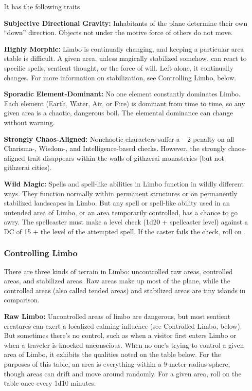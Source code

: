 It has the following traits.
\begin{itemize*}
\item \textbf{Subjective Directional Gravity:} Inhabitants of the plane determine their own ``down'' direction. Objects not under the motive force of others do not move.
\item \textbf{Highly Morphic:} Limbo is continually changing, and keeping a particular area stable is difficult. A given area, unless magically stabilized somehow, can react to specific spells, sentient thought, or the force of will. Left alone, it continually changes. For more information on stabilization, see Controlling Limbo, below.
\item \textbf{Sporadic Element-Dominant:} No one element constantly dominates Limbo. Each element (Earth, Water, Air, or Fire) is dominant from time to time, so any given area is a chaotic, dangerous boil. The elemental dominance can change without warning.
\item \textbf{Strongly Chaos-Aligned:} Nonchaotic characters suffer a $-2$ penalty on all Charisma-, Wisdom-, and Intelligence-based checks. However, the strongly chaos-aligned trait disappears within the walls of githzerai monasteries (but not githzerai cities).
\item \textbf{Wild Magic:} Spells and spell-like abilities in Limbo function in wildly different ways. They function normally within permanent structures or on permanently stabilized landscapes in Limbo. But any spell or spell-like ability used in an untended area of Limbo, or an area temporarily controlled, has a chance to go awry. The spellcaster must make a level check (1d20 + spellcaster level) against a DC of 15 + the level of the attempted spell. If the caster fails the check, roll on .
\end{itemize*}


\subsubsection{Controlling Limbo}
There are three kinds of terrain in Limbo: uncontrolled raw areas, controlled areas, and stabilized areas. Raw areas make up most of the plane, while the controlled areas (also called tended areas) and stabilized areas are tiny islands in comparison.

\textbf{Raw Limbo:} Uncontrolled areas of limbo are dangerous, but most sentient creatures can exert a localized calming influence (see Controlled Limbo, below). But sometimes there's no control, such as when a visitor first enters Limbo or when a traveler is knocked unconscious. When no one's trying to control a given area of Limbo, it exhibits the qualities noted on the table below. For the purposes of this table, an area is everything within a 9-meter-radius sphere, though areas can drift and move around randomly. For a given area, roll on the table once every 1d10 minutes.


